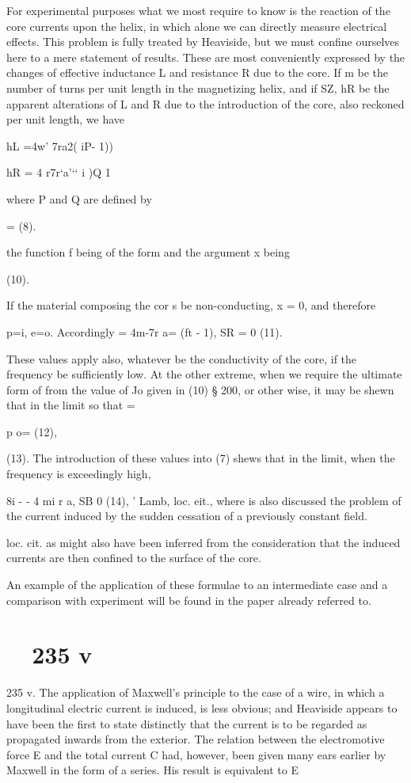 For experimental purposes what we most require to know is
the reaction of the core currents upon the helix, in which alone
we can directly measure electrical effects. This problem is fully
treated by Heaviside, but we must confine ourselves here to a
mere statement of results. These are most conveniently expressed
by the changes of effective inductance L and resistance R due to
the core. If m be the number of turns per unit length in the
magnetizing helix, and if SZ, hR be the apparent alterations of L
and R due to the introduction of the core, also reckoned per unit
length, we have

hL =4w' 7ra2( iP- 1))

hR = 4 r7r‘a'‘‘ i )Q 1

where P and Q are defined by

= (8).

the function f being of the form
and the argument x being

(10).

If the material composing the cor s be non-conducting, x = 0, and
therefore

p=i, e=o.
Accordingly = 4m-7r a= (ft - 1), SR = 0 (11).

These values apply also, whatever be the conductivity of the
core, if the frequency be sufficiently low.
At the other extreme, when  we require the ultimate
form of from the value of Jo given in (10) § 200, or other
wise, it may be shewn that in the limit
so that
=

p o=
(12),

(13).
The introduction of these values into (7) shews that in the
limit, when the frequency is exceedingly high,

8i - - 4 mi r a, SB  0 (14),
' Lamb, loc. eit., where is also discussed the problem of the current induced
by the sudden cessation of a previously constant field.

 loc. cit.
as might also have been inferred from the consideration that the
induced currents are then confined to the surface of the core.

An example of the application of these formulae to an intermediate case and a
comparison with experiment will be found in the paper already referred to.

\section{~~235 v}
235 v. The application of Maxwell’s principle to the case of
a wire, in which a longitudinal electric current is induced, is less
obvious; and Heaviside appears to have been the first to state
distinctly that the current is to be regarded as propagated inwards
from the exterior. The relation between the electromotive force
E and the total current C had, however, been given many ears
earlier by Maxwell in the form of a series. His result is equivalent to
E

